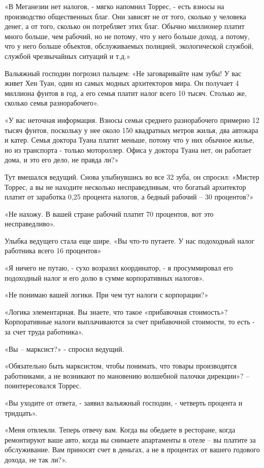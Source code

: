 \documentclass[10pt,final]{book}
\begin{document}
«В Меганезии нет налогов, - мягко напомнил Торрес, - есть взносы на производство общественных благ. Они зависят не от того, сколько у человека денег, а от того, сколько он потребляет этих благ. Обычно миллионер платит много больше, чем рабочий, но не потому, что у него больше доход, а потому, что у него больше объектов, обслуживаемых полицией, экологической службой, службой чрезвычайных ситуаций и т.д.»

Вальяжный господин погрозил пальцем: «Не заговаривайте нам зубы! У вас живет Хен Туан, один из самых модных архитекторов мира. Он получает 4 миллиона фунтов в год, а его семья платит налог всего 10 тысяч. Столько же, сколько семья разнорабочего».

«У вас неточная информация. Взносы семьи среднего разнорабочего примерно 12 тысяч фунтов, поскольку у нее около 150 квадратных метров жилья, два автокара и катер. Семья доктора Туана платит меньше, потому что у них обычное жилье, но из транспорта - только мотороллер. Офиса у доктора Туана нет, он работает дома, и это его дело, не правда ли?»

Тут вмешался ведущий. Снова улыбнувшись во все 32 зуба, он спросил: «Мистер Торрес, а вы не находите несколько несправедливым, что богатый архитектор платит от заработка 0,25 процента налогов, а бедный рабочий -- 30 процентов?»

«Не нахожу. В вашей стране рабочий платит 70 процентов, вот это несправедливо».

Улыбка ведущего стала еще шире. «Вы что-то путаете. У нас подоходный налог работника всего 16 процентов»

«Я ничего не путаю, - сухо возразил координатор, - я просуммировал его подоходный налог и его долю в сумме корпоративных налогов».

«Не понимаю вашей логики. При чем тут налоги с корпорации?»

«Логика элементарная. Вы знаете, что такое «прибавочная стоимость»? Корпоративные налоги выплачиваются за счет прибавочной стоимости, то есть - за счет труда работника».

«Вы -- марксист?» - спросил ведущий.

«Обязательно быть марксистом, чтобы понимать, что товары производятся работниками, а не возникают по мановению волшебной палочки дирекции»? -- поинтересовался Торрес.

«Вы уходите от ответа, - заявил вальяжный господин, - четверть процента и тридцать».

«Меня отвлекли. Теперь отвечу вам. Когда вы обедаете в ресторане, когда ремонтируют ваше авто, когда вы снимаете апартаменты в отеле -- вы платите за обслуживание. Вам приносят счет в деньгах, а не в процентах от вашего годового дохода, не так ли?».
\end{document}

